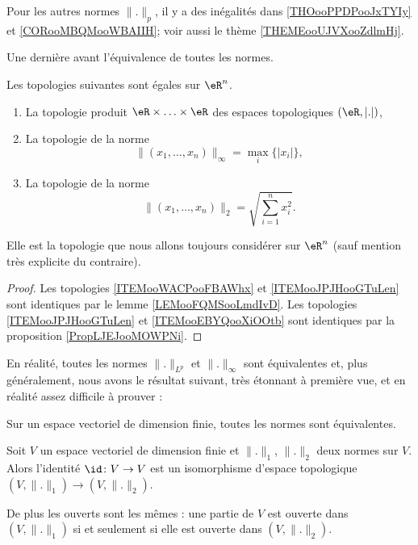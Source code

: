 Pour les autres normes \( \| . \|_p\), il y a des inégalités dans \ref{THOooPPDPooJxTYIy} et \ref{CORooMBQMooWBAIIH}; voir aussi le thème \ref{THEMEooUJVXooZdlmHj}.

Une dernière avant l'équivalence de toutes les normes.
\begin{propositionDef}
	Les topologies suivantes sont égales sur \( \eR^n\).
	\begin{enumerate}
		\item       \label{ITEMooWACPooFBAWhx}
		      La topologie produit \( \eR\times \ldots\times \eR\) des espaces topologiques \( (\eR,| . |)\),
		\item       \label{ITEMooJPJHooGTuLen}
		      La topologie de la norme
		      \begin{equation}
			      \| (x_1,\ldots, x_n) \|_{\infty}=\max_i\{ | x_i | \},
		      \end{equation}
		\item       \label{ITEMooEBYQooXiOOtb}
		      La topologie de la norme
		      \begin{equation}
			      \| (x_1,\ldots, x_n) \|_2=\sqrt{ \sum_{i=1}^nx_i^2 }.
		      \end{equation}
	\end{enumerate}
	Elle est la topologie que nous allons toujours considérer sur \( \eR^n\) (sauf mention très explicite du contraire).
\end{propositionDef}

\begin{proof}
	Les topologies \ref{ITEMooWACPooFBAWhx} et \ref{ITEMooJPJHooGTuLen} sont identiques par le lemme \ref{LEMooFQMSooLmdIvD}. Les topologies \ref{ITEMooJPJHooGTuLen} et \ref{ITEMooEBYQooXiOOtb} sont identiques par la proposition \ref{PropLJEJooMOWPNi}.
\end{proof}

En réalité, toutes les normes \( \| . \|_{L^p}\) et \( \| . \|_{\infty}\) sont équivalentes et, plus généralement, nous avons le résultat suivant, très étonnant à première vue, et en réalité assez difficile à prouver :
\begin{theorem}    \label{ThoNormesEquiv}
	Sur un espace vectoriel de dimension finie, toutes les normes sont équivalentes.
\end{theorem}

\begin{corollary}       \label{CORooBRDYooLmGJDE}
	Soit \( V\) un espace vectoriel de dimension finie et \( \| . \|_1\), \( \| . \|_2\) deux normes sur \( V\). Alors l'identité \( \id\colon V\to V\) est un isomorphisme d'espace topologique \( (V,\| . \|_1)\to (V,\| . \|_2)\).

	De plus les ouverts sont les mêmes : une partie de \( V\) est ouverte dans \( (V,\| . \|_1)\) si et seulement si elle est ouverte dans \( (V,\| . \|_2)\).
\end{corollary}

